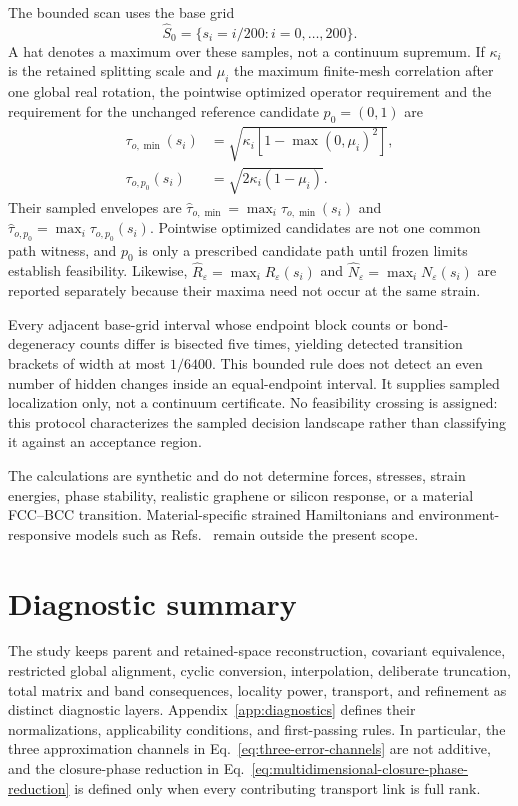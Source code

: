 \documentclass[11pt]{article}
\begin{document}
The bounded scan uses the base grid
\begin{equation}
 \widehat S_0=\{s_i=i/200:i=0,\ldots,200\}.
 \label{eq:strain-scan-grid}
\end{equation}
A hat denotes a maximum over these samples, not a continuum supremum. If $\kappa_i$ is
the retained splitting scale and $\mu_i$ the maximum finite-mesh correlation after one
global real rotation, the pointwise optimized operator requirement and the requirement
for the unchanged reference candidate $p_0=(0,1)$ are
\begin{align}
 \tau_{o,\min}(s_i)
 &=\sqrt{\kappa_i[1-\max(0,\mu_i)^2]},\\
 \tau_{o,p_0}(s_i)
 &=\sqrt{2\kappa_i(1-\mu_i)}.
 \label{eq:strain-scan-witness-requirements}
\end{align}
Their sampled envelopes are $\widehat\tau_{o,\min}=\max_i\tau_{o,\min}(s_i)$ and
$\widehat\tau_{o,p_0}=\max_i\tau_{o,p_0}(s_i)$. Pointwise optimized candidates are not
one common path witness, and $p_0$ is only a prescribed candidate path until frozen
limits establish feasibility. Likewise,
$\widehat R_\varepsilon=\max_iR_\varepsilon(s_i)$ and
$\widehat N_\varepsilon=\max_iN_\varepsilon(s_i)$ are reported separately because their
maxima need not occur at the same strain.

Every adjacent base-grid interval whose endpoint block counts or bond-degeneracy counts
differ is bisected five times, yielding detected transition brackets of width at most
$1/6400$. This bounded rule does not detect an even number of hidden changes inside an
equal-endpoint interval. It supplies sampled localization only, not a continuum
certificate. No feasibility crossing is assigned: this protocol characterizes the sampled decision
landscape rather than classifying it against an acceptance region.

The calculations are synthetic and do not determine forces, stresses, strain energies,
phase stability, realistic graphene or silicon response, or a material FCC--BCC
transition. Material-specific strained Hamiltonians and environment-responsive models
such as Refs.~\cite{Fang2018Strained2D,Zhang2022EquivariantHamiltonians} remain outside
the present scope.

\section{Diagnostic summary}

The study keeps parent and retained-space reconstruction, covariant equivalence,
restricted global alignment, cyclic conversion, interpolation, deliberate truncation,
total matrix and band consequences, locality power, transport, and refinement as
distinct diagnostic layers. Appendix~\ref{app:diagnostics} defines their
normalizations, applicability conditions, and first-passing rules. In particular, the
three approximation channels in Eq.~\eqref{eq:three-error-channels} are not additive,
and the closure-phase reduction in
Eq.~\eqref{eq:multidimensional-closure-phase-reduction} is defined only when every
contributing transport link is full rank.
\end{document}
